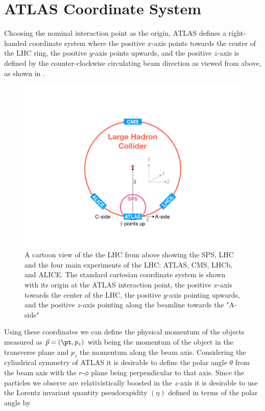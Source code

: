 \section{ATLAS Coordinate System} \label{sec:atlas:coordinates}

Choosing the nominal interaction point as the origin, ATLAS defines a right-handed
coordinate system where the positive $x$-axis points towards the center of the
LHC ring, the positive $y$-axis points upwards, and the positive $z$-axis is
defined by the counter-clockwise circulating beam direction as viewed from
above, as shown in  \cite{PERF-2007-01}.  
 
\begin{figure}[!htbp]
  \begin{center}
    \includegraphics[width=0.5\linewidth]{figures/atlas/atlas_geometry}
    \caption{ \cite{Stark:2317296} A cartoon view of the the LHC from above
showing the SPS, LHC and the four main experiments of the LHC: ATLAS, CMS, LHCb,
and ALICE.  The standard cartesian coordinate system is shown with its origin at
the ATLAS interaction point, the positive $x$-axis towards the center of the
LHC, the positive $y$-axis pointing upwards, and the positive $z$-axis pointing
along the beamline towards the "A-side"}
    \label{fig:atlas_geometry}
  \end{center}
\end{figure}

Using these coordinates we can define the physical momentum of the objects
measured as $\vec{p} = (\pt,p_z)$ with \pt being the momentum of the object in
the transverse plane and $p_z$ the momentum along the beam axis. Considering the
cylindrical symmetry of ATLAS it is desirable to define the polar angle
$\theta$ from the beam axis with the $r$-$\phi$ plane being perpendicular to that
axis. Since the particles we observe are relativistically boosted in the
$z$-axis it is desirable to use the Lorentz invariant quantity pseudorapidity
$(\eta)$ defined in terms of the polar angle by

